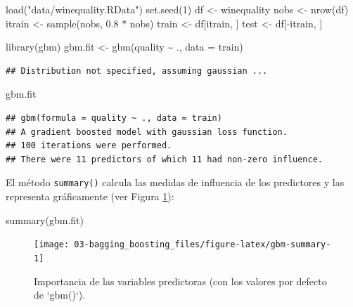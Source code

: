 \documentclass[
  spanish,
]{book}
\newenvironment{Shaded}{\begin{snugshade}}{\end{snugshade}}
\newcommand{\AttributeTok}[1]{\textcolor[rgb]{0.77,0.63,0.00}{#1}}
\newcommand{\DecValTok}[1]{\textcolor[rgb]{0.00,0.00,0.81}{#1}}
\newcommand{\FloatTok}[1]{\textcolor[rgb]{0.00,0.00,0.81}{#1}}
\newcommand{\FunctionTok}[1]{\textcolor[rgb]{0.00,0.00,0.00}{#1}}
\newcommand{\NormalTok}[1]{#1}
\newcommand{\OtherTok}[1]{\textcolor[rgb]{0.56,0.35,0.01}{#1}}
\newcommand{\SpecialCharTok}[1]{\textcolor[rgb]{0.00,0.00,0.00}{#1}}
\newcommand{\StringTok}[1]{\textcolor[rgb]{0.31,0.60,0.02}{#1}}
\theoremstyle{break}
\theoremstyle{definition}
\theoremstyle{definition}
\theoremstyle{definition}
\theoremstyle{definition}
\theoremstyle{remark}
\begin{document}
\begin{Shaded}
\begin{Highlighting}[]
\FunctionTok{load}\NormalTok{(}\StringTok{"data/winequality.RData"}\NormalTok{)}
\FunctionTok{set.seed}\NormalTok{(}\DecValTok{1}\NormalTok{)}
\NormalTok{df }\OtherTok{\textless{}{-}}\NormalTok{ winequality}
\NormalTok{nobs }\OtherTok{\textless{}{-}} \FunctionTok{nrow}\NormalTok{(df)}
\NormalTok{itrain }\OtherTok{\textless{}{-}} \FunctionTok{sample}\NormalTok{(nobs, }\FloatTok{0.8} \SpecialCharTok{*}\NormalTok{ nobs)}
\NormalTok{train }\OtherTok{\textless{}{-}}\NormalTok{ df[itrain, ]}
\NormalTok{test }\OtherTok{\textless{}{-}}\NormalTok{ df[}\SpecialCharTok{{-}}\NormalTok{itrain, ]}

\FunctionTok{library}\NormalTok{(gbm)}
\NormalTok{gbm.fit }\OtherTok{\textless{}{-}} \FunctionTok{gbm}\NormalTok{(quality }\SpecialCharTok{\textasciitilde{}}\NormalTok{ ., }\AttributeTok{data =}\NormalTok{ train)}
\end{Highlighting}
\end{Shaded}

\begin{verbatim}
## Distribution not specified, assuming gaussian ...
\end{verbatim}

\begin{Shaded}
\begin{Highlighting}[]
\NormalTok{gbm.fit}
\end{Highlighting}
\end{Shaded}

\begin{verbatim}
## gbm(formula = quality ~ ., data = train)
## A gradient boosted model with gaussian loss function.
## 100 iterations were performed.
## There were 11 predictors of which 11 had non-zero influence.
\end{verbatim}

El método \texttt{summary()} calcula las medidas de influencia de los predictores y las representa gráficamente (ver Figura \ref{fig:gbm-summary}):

\begin{Shaded}
\begin{Highlighting}[]
\FunctionTok{summary}\NormalTok{(gbm.fit)}
\end{Highlighting}
\end{Shaded}

\begin{figure}[!htb]

{\centering \texttt{[image: 03-bagging\_boosting\_files/figure-latex/gbm-summary-1]} 

}

\caption{Importancia de las variables predictoras (con los valores por defecto de `gbm()`).}\label{fig:gbm-summary}
\end{figure}
\end{document}
